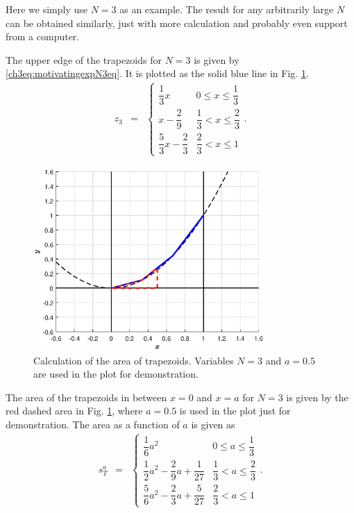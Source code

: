 Here we simply use $N=3$ as an example. The result for any arbitrarily large $N$ can be obtained similarly, just with more calculation and probably even support from a computer.

The upper edge of the trapezoids for $N=3$ is given by \ref{ch3eq:motivatingexpN3eq}. It is plotted as the solid blue line in Fig. \ref{ch3fig:motivatingexpN3tra}.
\begin{eqnarray}
    z_{3} &=& \left\{\begin{array}{cc}
        \dfrac{1}{3}x & 0 \leq x \leq \dfrac{1}{3} \\
        x - \dfrac{2}{9} & \dfrac{1}{3} < x \leq \dfrac{2}{3} \\
        \dfrac{5}{3}x - \dfrac{2}{3} & \dfrac{2}{3} < x \leq 1
    \end{array}\right. .\label{ch3eq:motivatingexpN3eq}
\end{eqnarray}

\begin{figure}
\centering
\includegraphics[width=250pt]{chapters/part-1/figures/motivatingexpN3tra.eps}
\caption{Calculation of the area of trapezoids. Variables $N=3$ and $a=0.5$ are used in the plot for demonstration.} \label{ch3fig:motivatingexpN3tra}
\end{figure}

The area of the trapezoids in between $x=0$ and $x=a$ for $N=3$ is given by the red dashed area in Fig. \ref{ch3fig:motivatingexpN3tra}, where $a=0.5$ is used in the plot just for demonstration. The area as a function of $a$ is given as
\begin{eqnarray}
   s_{T}^a &=& \left\{\begin{array}{cc}
        \dfrac{1}{6}a^2 & 0 \leq a \leq \dfrac{1}{3} \\
        \dfrac{1}{2}a^2 - \dfrac{2}{9}a + \dfrac{1}{27} & \dfrac{1}{3} < a \leq \dfrac{2}{3} \\
        \dfrac{5}{6}a^2 - \dfrac{2}{3}a + \dfrac{5}{27} & \dfrac{2}{3} < a \leq 1
    \end{array}\right.. \label{ch3eq:motivatingexpN3eqint}
\end{eqnarray}


